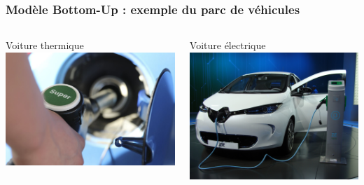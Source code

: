 \documentclass{beamer}
\begin{document}
 \begin{frame}
\frametitle{Modèle Bottom-Up : exemple du parc de véhicules}
\vspace{0,5cm}
\begin{columns}
  \begin{column}{0.5\textwidth}
  Voiture thermique
  \includegraphics[scale=0.43]{images/essence.jpg}
\end{column}
\begin{column}{0.5\textwidth}
Voiture électrique
\includegraphics[scale=0.037]{images/voiture_electrique.JPG}
\end{column}
\end{columns}


\end{frame}
\end{document}
